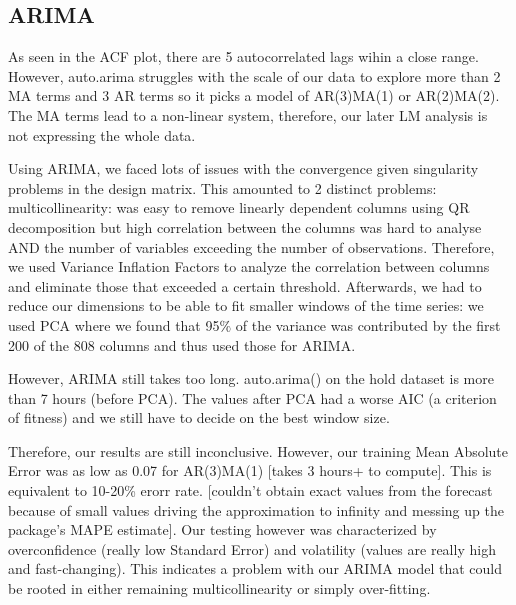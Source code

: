 \documentclass{article}
\begin{document}
	\subsection{ARIMA}
	As seen in the ACF plot, there are 5 autocorrelated lags wihin a close range. However, auto.arima struggles with the scale of our data to explore more than 2 MA terms and 3 AR terms so it picks a model of AR(3)MA(1) or AR(2)MA(2). The MA terms lead to a non-linear system, therefore, our later LM analysis is not expressing the whole data.
	
	Using ARIMA, we faced lots of issues with the convergence given singularity problems in the design matrix. This amounted to 2 distinct problems: multicollinearity: was easy to remove linearly dependent columns using QR decomposition but high correlation between the columns was hard to analyse AND the number of variables exceeding the number of observations. Therefore, we used Variance Inflation Factors to analyze the correlation between columns and eliminate those that exceeded a certain threshold. Afterwards, we had to reduce our dimensions to be able to fit smaller windows of the time series: we used PCA where we found that 95$\%$ of the variance was contributed by the first 200 of the 808 columns and thus used those for ARIMA.
	
	However, ARIMA still takes too long. auto.arima() on the hold dataset is more than 7 hours (before PCA). The values after PCA had a worse AIC (a criterion of fitness) and we still have to decide on the best window size.
	
	Therefore, our results are still inconclusive. However, our training Mean Absolute Error was as low as 0.07 for AR(3)MA(1) [takes 3 hours+ to compute]. This is equivalent to 10-20\% erorr rate. [couldn't obtain exact values from the forecast because of small values driving the approximation to infinity and messing up the package's MAPE estimate].
	Our testing however was characterized by overconfidence (really low Standard Error) and volatility (values are really high and fast-changing). This indicates a problem with our ARIMA model that could be rooted in either remaining multicollinearity or simply over-fitting.

	
\end{document}
